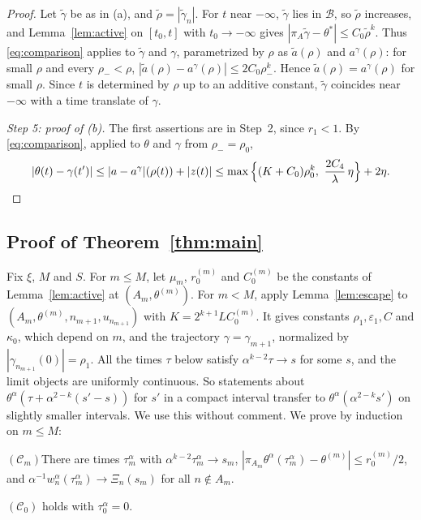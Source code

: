 \documentclass[11pt]{article}
\theoremstyle{definition}
\theoremstyle{remark}
\newcommand{\cB}{\mathcal{B}}
\newcommand{\eps}{\varepsilon}
\begin{document}
\begin{proof}
Let $\tilde\gamma$ be as in (a), and $\tilde\rho=|\tilde\gamma_n|$. For $t$ near $-\infty$, $\tilde\gamma$ lies in $\cB$, so $\tilde\rho$ increases, and Lemma~\ref{lem:active} on $[t_0,t]$ with $t_0\to-\infty$ gives $|\pi_A\tilde\gamma-\theta^*|\le C_0\tilde\rho^k$. Thus \eqref{eq:comparison} applies to $\tilde\gamma$ and $\gamma$, parametrized by $\rho$ as $\tilde a(\rho)$ and $a^\gamma(\rho)$: for small $\rho$ and every $\rho_-<\rho$, $|\tilde a(\rho)-a^\gamma(\rho)|\le2C_0\rho_-^k$. Hence $\tilde a(\rho)=a^\gamma(\rho)$ for small $\rho$. Since $t$ is determined by $\rho$ up to an additive constant, $\tilde\gamma$ coincides near $-\infty$ with a time translate of $\gamma$.

\emph{Step 5: proof of (b).} The first assertions are in Step~2, since $r_1<1$. By \eqref{eq:comparison}, applied to $\theta$ and $\gamma$ from $\rho_-=\rho_0$,
\[
|\theta(t)-\gamma(t')|\le|a-a^\gamma|(\rho(t))+|z(t)|\le\max\Big\{(K+C_0)\rho_0^k,\ \frac{2C_4}{\lambda}\,\eta\Big\}+2\eta .\qedhere
\]
\end{proof}

\subsection*{Proof of Theorem~\ref{thm:main}}

Fix $\xi$, $M$ and $S$. For $m\le M$, let $\mu_m$, $r^{(m)}_0$ and $C^{(m)}_0$ be the constants of Lemma~\ref{lem:active} at $(A_m,\theta^{(m)})$. For $m<M$, apply Lemma~\ref{lem:escape} to $(A_m,\theta^{(m)},n_{m+1},u_{n_{m+1}})$ with $K=2^{k+1}LC^{(m)}_0$. It gives constants $\rho_1,\eps_1,C$ and $\kappa_0$, which depend on $m$, and the trajectory $\gamma=\gamma_{m+1}$, normalized by $|\gamma_{n_{m+1}}(0)|=\rho_1$. All the times $\tau$ below satisfy $\alpha^{k-2}\tau\to s$ for some $s$, and the limit objects are uniformly continuous. So statements about $\theta^\alpha(\tau+\alpha^{2-k}(s'-s))$ for $s'$ in a compact interval transfer to $\theta^\alpha(\alpha^{2-k}s')$ on slightly smaller intervals. We use this without comment. We prove by induction on $m\le M$:

\smallskip\noindent$(\mathcal C_m)$\quad There are times $\tau^\alpha_m$ with $\alpha^{k-2}\tau^\alpha_m\to s_m$, $|\pi_{A_m}\theta^\alpha(\tau^\alpha_m)-\theta^{(m)}|\le r^{(m)}_0/2$, and $\alpha^{-1}w^\alpha_n(\tau^\alpha_m)\to\Xi_n(s_m)$ for all $n\notin A_m$.

\smallskip\noindent$(\mathcal C_0)$ holds with $\tau^\alpha_0=0$.
\end{document}
